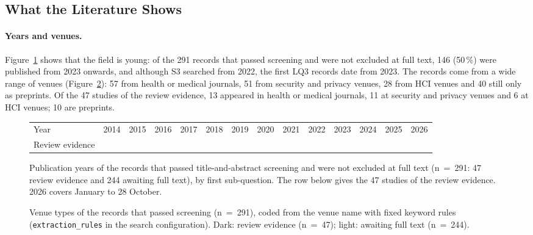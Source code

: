 \subsection{What the Literature Shows}

\paragraph{Years and venues.} Figure~\ref{fig:lit-years} shows that the field
is young: of the 291 records that passed screening and were not excluded at full
text, 146 (50\,\%) were published from 2023 onwards, and although S3 searched
from 2022, the first LQ3 records date from 2023. The records come from a wide
range of venues
(Figure~\ref{fig:lit-venues}): 57 from health or medical journals, 51 from
security and privacy venues, 28 from HCI venues and 40 still only as
preprints. Of the 47 studies of the review evidence, 13 appeared in health or
medical journals, 11 at security and privacy venues and 6 at HCI venues; 10
are preprints.

\begin{figure}[tbp]
\centering

\par\smallskip
{\scriptsize\setlength{\tabcolsep}{3.1pt}
\begin{tabular}{@{}l*{13}{r}@{}}
Year & 2014 & 2015 & 2016 & 2017 & 2018 & 2019 & 2020 & 2021 & 2022 & 2023 & 2024 & 2025 & 2026 \\
Review evidence & 
\end{tabular}}
\caption[Publication years of the screened literature]{Publication years of the
records that passed title-and-abstract screening and were not excluded at full
text (n~=~291: 47 review evidence and 244 awaiting full text), by first
sub-question. The row below gives the 47 studies of the review evidence. 2026
covers January to 28 October.}
\label{fig:lit-years}
\end{figure}

\begin{figure}[tbp]
\centering

\caption[Venue types of the screened literature]{Venue types of the records that
passed screening (n~=~291), coded from the venue name with fixed keyword
rules (\texttt{extraction\_rules} in the search configuration). Dark: review
evidence (n~=~47); light: awaiting full text (n~=~244).}
\label{fig:lit-venues}
\end{figure}


